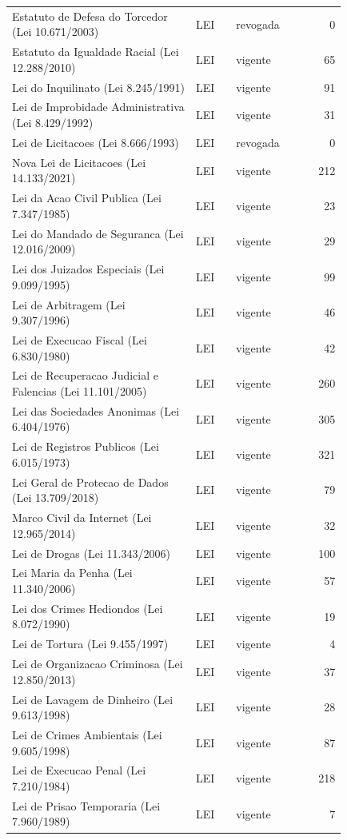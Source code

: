 \begin{longtable}{p{0.55\linewidth}p{0.12\linewidth}p{0.16\linewidth}r}
Estatuto de Defesa do Torcedor (Lei 10.671/2003) & LEI & revogada & 0\\
Estatuto da Igualdade Racial (Lei 12.288/2010) & LEI & vigente & 65\\
Lei do Inquilinato (Lei 8.245/1991) & LEI & vigente & 91\\
Lei de Improbidade Administrativa (Lei 8.429/1992) & LEI & vigente & 31\\
Lei de Licitacoes (Lei 8.666/1993) & LEI & revogada & 0\\
Nova Lei de Licitacoes (Lei 14.133/2021) & LEI & vigente & 212\\
Lei da Acao Civil Publica (Lei 7.347/1985) & LEI & vigente & 23\\
Lei do Mandado de Seguranca (Lei 12.016/2009) & LEI & vigente & 29\\
Lei dos Juizados Especiais (Lei 9.099/1995) & LEI & vigente & 99\\
Lei de Arbitragem (Lei 9.307/1996) & LEI & vigente & 46\\
Lei de Execucao Fiscal (Lei 6.830/1980) & LEI & vigente & 42\\
Lei de Recuperacao Judicial e Falencias (Lei 11.101/2005) & LEI & vigente & 260\\
Lei das Sociedades Anonimas (Lei 6.404/1976) & LEI & vigente & 305\\
Lei de Registros Publicos (Lei 6.015/1973) & LEI & vigente & 321\\
Lei Geral de Protecao de Dados (Lei 13.709/2018) & LEI & vigente & 79\\
Marco Civil da Internet (Lei 12.965/2014) & LEI & vigente & 32\\
Lei de Drogas (Lei 11.343/2006) & LEI & vigente & 100\\
Lei Maria da Penha (Lei 11.340/2006) & LEI & vigente & 57\\
Lei dos Crimes Hediondos (Lei 8.072/1990) & LEI & vigente & 19\\
Lei de Tortura (Lei 9.455/1997) & LEI & vigente & 4\\
Lei de Organizacao Criminosa (Lei 12.850/2013) & LEI & vigente & 37\\
Lei de Lavagem de Dinheiro (Lei 9.613/1998) & LEI & vigente & 28\\
Lei de Crimes Ambientais (Lei 9.605/1998) & LEI & vigente & 87\\
Lei de Execucao Penal (Lei 7.210/1984) & LEI & vigente & 218\\
Lei de Prisao Temporaria (Lei 7.960/1989) & LEI & vigente & 7\\

\end{longtable}
